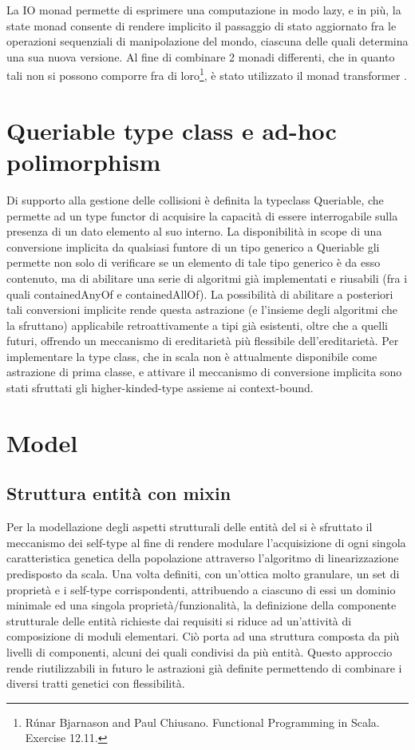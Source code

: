 La IO monad permette di esprimere una computazione in modo lazy, e in più, la state monad consente di rendere implicito il passaggio di stato aggiornato fra le operazioni sequenziali di manipolazione del mondo, ciascuna delle quali determina una sua nuova versione. Al fine di combinare 2 monadi differenti, che in quanto tali non si possono comporre fra di loro\footnote{Rúnar Bjarnason and Paul Chiusano. Functional Programming in Scala. Exercise 12.11.}, è stato utilizzato il monad transformer .

\section{Queriable type class e ad-hoc polimorphism}
Di supporto alla gestione delle collisioni è definita la typeclass Queriable, che permette ad un type functor di acquisire la capacità di essere interrogabile sulla presenza di un dato elemento al suo interno. La disponibilità in scope di una conversione implicita da qualsiasi funtore di un tipo generico a Queriable gli permette non solo di verificare se un elemento di tale tipo generico è da esso contenuto, ma di abilitare una serie di algoritmi già implementati e riusabili (fra i quali containedAnyOf e containedAllOf). La possibilità di abilitare a posteriori tali conversioni implicite rende questa astrazione (e l’insieme degli algoritmi che la sfruttano) applicabile retroattivamente a tipi già esistenti, oltre che a quelli futuri, offrendo un meccanismo di ereditarietà più flessibile dell’ereditarietà. Per implementare la type class, che in scala non è attualmente disponibile come astrazione di prima classe, e attivare il meccanismo di conversione implicita sono stati sfruttati gli higher-kinded-type assieme ai context-bound.

\section{Model}

\subsection{Struttura entità con mixin}
Per la modellazione degli aspetti strutturali delle entità del  si è sfruttato il meccanismo dei self-type al fine di rendere modulare l’acquisizione di ogni singola caratteristica genetica della popolazione attraverso l’algoritmo di linearizzazione predisposto da scala. Una volta definiti, con un’ottica molto granulare, un set di proprietà e i self-type corrispondenti, attribuendo a ciascuno di essi un dominio minimale ed una singola proprietà/funzionalità, la definizione della componente strutturale delle entità richieste dai requisiti si riduce ad un’attività di composizione di moduli elementari. Ciò porta ad una struttura composta da più livelli di componenti, alcuni dei quali condivisi da più entità. Questo approccio rende riutilizzabili in futuro le astrazioni già definite permettendo di combinare i diversi tratti genetici con flessibilità.

